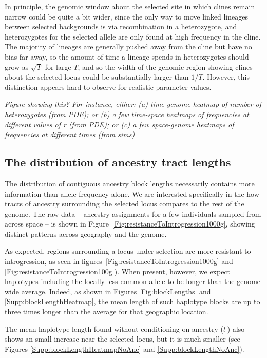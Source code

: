 \documentclass[11pt,letterpaper]{article}
\newcommand{\plr}[1]{{\em \color{blue} #1}}
\begin{document}
In principle, the genomic window about the selected site
in which clines remain narrow could be quite a bit wider,
since the only way to move linked lineages between selected backgrounds is via recombination in a heterozygote,
and heterozygotes for the selected allele are only found at high frequency in the cline.
The majority of lineages are generally pushed away from the cline but have no bias far away,
so the amount of time a lineage spends in heterozygotes should grow as $\sqrt{T}$ for large $T$,
and so the width of the genomic region showing clines about the selected locus could be 
substantially larger than $1/T$. However, this distinction appears hard to observe for realistic parameter values.



\plr{Figure showing this? 
    For instance, either: (a) time-genome heatmap of number of heterozygotes (from PDE);
    or (b) a few time-space heatmaps of frequencies at different values of r (from PDE);
    or (c) a few space-genome heatmaps of frequencies at different times (from sims)
}



\subsection*{The distribution of ancestry tract lengths}

The distribution of contiguous ancestry block lengths necessarily contains more information than allele frequency alone. We are interested specifically in the how tracts of ancestry surrounding the selected locus compares to the rest of the genome. 
The raw data -- ancestry assignments for a few individuals sampled from across space --
is shown in Figure~\ref{Fig:resistanceToIntrogression1000g},
showing distinct patterns across geography and the genome.

As expected, regions surrounding a locus under selection are more resistant to introgression,
as seen in figures~\ref{Fig:resistanceToIntrogression1000g} and \ref{Fig:resistanceToIntrogression100g}).
When present, however, we expect haplotypes including the locally less common allele
to be longer than the genome-wide average.
Indeed,
as shown in Figures \ref{Fig:blockLengths} and \ref{Supp:blockLengthHeatmap},
the mean length of such haplotype blocks are up to three times longer
than the average for that geographic location.


The mean haplotype length found without conditioning on ancestry ($l_\cdot$)
also shows an small increase near the selected locus,
but it is much smaller (see Figures \ref{Supp:blockLengthHeatmapNoAnc} and \ref{Supp:blockLengthNoAnc}).
\end{document}
